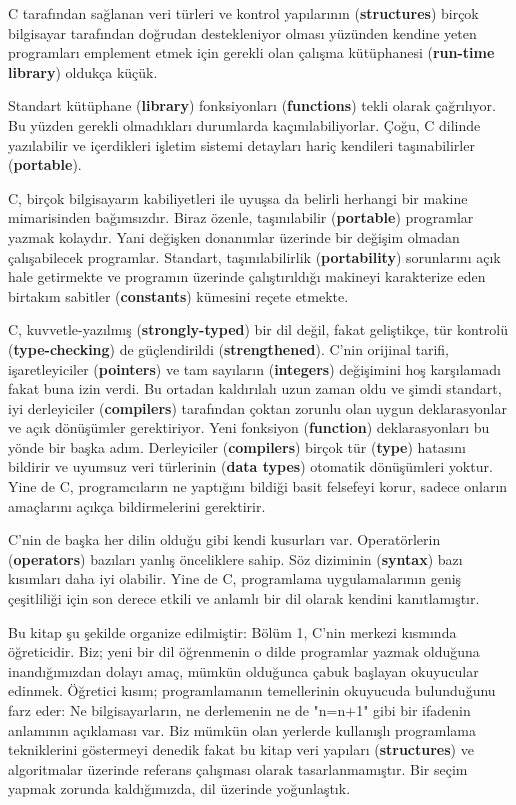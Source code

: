 \documentclass[a4paper,12pt,oneside]{book}
\begin{document}
\par C tarafından sağlanan veri türleri ve kontrol yapılarının (\textbf{structures}) birçok bilgisayar tarafından doğrudan destekleniyor olması yüzünden kendine yeten programları emplement etmek için gerekli olan çalışma kütüphanesi (\textbf{run-time library}) oldukça küçük. \pagebreak

\noindent \thispagestyle{introduction} Standart kütüphane (\textbf{library}) fonksiyonları (\textbf{functions}) tekli olarak çağrılıyor. Bu yüzden gerekli olmadıkları durumlarda kaçınılabiliyorlar. Çoğu, C dilinde yazılabilir ve içerdikleri işletim sistemi detayları hariç kendileri taşınabilirler (\textbf{portable}).
\par C, birçok bilgisayarın kabiliyetleri ile uyuşsa da belirli herhangi bir makine mimarisinden bağımsızdır. Biraz özenle, taşınılabilir (\textbf{portable}) programlar yazmak kolaydır. Yani değişken donanımlar üzerinde bir değişim olmadan çalışabilecek programlar. Standart, taşınılabilirlik (\textbf{portability}) sorunlarını açık hale getirmekte ve programın üzerinde çalıştırıldığı makineyi karakterize eden birtakım sabitler (\textbf{constants}) kümesini reçete etmekte.
\par C, kuvvetle-yazılmış (\textbf{strongly-typed}) bir dil değil, fakat geliştikçe, tür kontrolü (\textbf{type-checking}) de güçlendirildi (\textbf{strengthened}). C'nin orijinal tarifi, işaretleyiciler (\textbf{pointers}) ve tam sayıların (\textbf{integers}) değişimini hoş karşılamadı fakat buna izin verdi. Bu ortadan kaldırılalı uzun zaman oldu ve şimdi standart, iyi derleyiciler (\textbf{compilers}) tarafından çoktan zorunlu olan uygun deklarasyonlar ve açık dönüşümler gerektiriyor. Yeni fonksiyon (\textbf{function}) deklarasyonları bu yönde bir başka adım. Derleyiciler (\textbf{compilers}) birçok tür (\textbf{type}) hatasını bildirir ve uyumsuz veri türlerinin (\textbf{data types}) otomatik dönüşümleri yoktur. Yine de C, programcıların ne yaptığını bildiği basit felsefeyi korur, sadece onların amaçlarını açıkça bildirmelerini gerektirir.
\par C'nin de başka her dilin olduğu gibi kendi kusurları var. Operatörlerin (\textbf{operators}) bazıları yanlış önceliklere sahip. Söz diziminin (\textbf{syntax}) bazı kısımları daha iyi olabilir. Yine de C, programlama uygulamalarının geniş çeşitliliği için son derece etkili ve anlamlı bir dil olarak kendini kanıtlamıştır.
\par Bu kitap şu şekilde organize edilmiştir: Bölüm 1, C'nin merkezi kısmında öğreticidir. Biz; yeni bir dil öğrenmenin o dilde programlar yazmak olduğuna inandığımızdan dolayı amaç, mümkün olduğunca çabuk başlayan okuyucular edinmek. Öğretici kısım; programlamanın temellerinin okuyucuda bulunduğunu farz eder: Ne bilgisayarların, ne derlemenin ne de "n=n+1" gibi bir ifadenin anlamının açıklaması var. Biz mümkün olan yerlerde kullanışlı programlama tekniklerini göstermeyi denedik fakat bu kitap veri yapıları (\textbf{structures}) ve algoritmalar üzerinde referans çalışması olarak tasarlanmamıştır. Bir seçim yapmak zorunda kaldığımızda, dil üzerinde yoğunlaştık.
\end{document}
